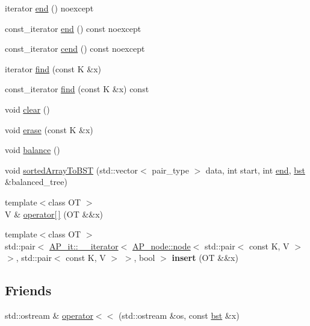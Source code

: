 \begin{DoxyCompactItemize}
iterator \hyperlink{classBST_1_1bst_a3620e47dedded6930a8b0488fe6ced6b}{end} () noexcept
\item 
const\+\_\+iterator \hyperlink{classBST_1_1bst_acd7c23bcd5cf4f947ce2c0ac88fe646b}{end} () const noexcept
\item 
const\+\_\+iterator \hyperlink{classBST_1_1bst_a17559d18bdbc5db5b77537a7044e449d}{cend} () const noexcept
\item 
iterator \hyperlink{classBST_1_1bst_a35880bb25ce5fbe2a10ce004b33cd5f2}{find} (const K \&x)
\item 
const\+\_\+iterator \hyperlink{classBST_1_1bst_a5c0e2b56c838441ec33d29c0184b941b}{find} (const K \&x) const
\item 
void \hyperlink{classBST_1_1bst_a25224d3f487fe02a1be8767e4fc3b8fd}{clear} ()
\item 
void \hyperlink{classBST_1_1bst_a6cd8cd1e40106c21145ae0949159bd34}{erase} (const K \&x)
\item 
void \hyperlink{classBST_1_1bst_af4df6a5c2ae79c5133688b3e117d622b}{balance} ()
\item 
void \hyperlink{classBST_1_1bst_a6e73f752cee124c1421fb32a6a6b4c8f}{sorted\+Array\+To\+B\+ST} (std\+::vector$<$ pair\+\_\+type $>$ data, int start, int \hyperlink{classBST_1_1bst_a3620e47dedded6930a8b0488fe6ced6b}{end}, \hyperlink{classBST_1_1bst}{bst} \&balanced\+\_\+tree)
\item 
{\footnotesize template$<$class OT $>$ }\\V \& \hyperlink{classBST_1_1bst_a4d960d28e5384f9cfc834f68405047da}{operator\mbox{[}$\,$\mbox{]}} (OT \&\&x)
\item 
\mbox{\label{classBST_1_1bst_a83872d5db154816bff407ab1855fd293}} 
{\footnotesize template$<$class OT $>$ }\\std\+::pair$<$ \hyperlink{classAP__it_1_1____iterator}{A\+P\+\_\+it\+::\+\_\+\+\_\+iterator}$<$ \hyperlink{structAP__node_1_1node}{A\+P\+\_\+node\+::node}$<$ std\+::pair$<$ const K, V $>$ $>$, std\+::pair$<$ const K, V $>$ $>$, bool $>$ {\bfseries insert} (OT \&\&x)
\end{DoxyCompactItemize}
\subsection*{Friends}
\begin{DoxyCompactItemize}
\item 
std\+::ostream \& \hyperlink{classBST_1_1bst_ae4b7d69364fca0855f74abdcad674ebf}{operator$<$$<$} (std\+::ostream \&os, const \hyperlink{classBST_1_1bst}{bst} \&x)
\end{DoxyCompactItemize}


